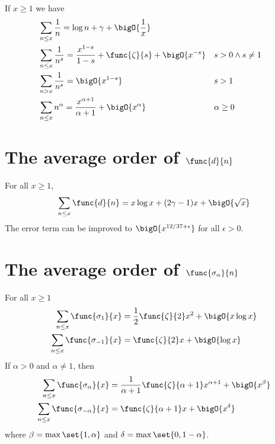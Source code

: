 \begin{theorem}
    If \(x \geq 1\) we have 
    \begin{align}
        &\sum_{n \leq x} \frac{1}{n} = \log n + \gamma + \bigO{\frac{1}{x}}\\
        &\sum_{n \leq x} \dfrac{1}{n^s} = \dfrac{x^{1-s}}{1-s} + \func{\zeta}{s} + \bigO{x^{-s}} & & s > 0 \land s \neq 1\\
        &\sum_{n > x} \dfrac{1}{n^s} = \bigO{x^{1-s}} & & s > 1\\
        &\sum_{n \leq x} n^{\alpha} = \dfrac{x^{\alpha + 1}}{\alpha + 1} + \bigO{x^{\alpha}}  & & \alpha \geq 0
    \end{align}
\end{theorem}
\section{The average order of \(\func{d}{n}\)}
\begin{theorem}
    For all \(x \geq 1\),
    \begin{equation*}
        \sum_{n \leq x} \func{d}{n} = x \log x + (2\gamma - 1) x + \bigO{\sqrt{x}}
    \end{equation*}
    The error term can be improved to \(\bigO{x^{12/37 + \epsilon}}\) for all \(\epsilon > 0\).
\end{theorem}

\section{The average order of \(\func{\sigma_{\alpha}}{n}\)}

\begin{theorem}
    For all \(x \geq 1\)
    \begin{align*}
        \sum_{n \leq x} \func{\sigma_1}{x} &= \dfrac{1}{2} \func{\zeta}{2} x^2 + \bigO{x \log x}\\
        \sum_{n \leq x} \func{\sigma_{-1}}{x} &= \func{\zeta}{2} x + \bigO{\log x}\\
    \end{align*}
    If \(\alpha > 0\) and \(\alpha \neq 1\), then 
    \begin{align*}
        \sum_{n \leq x} \func{\sigma_{\alpha}}{x} &= \dfrac{1}{\alpha + 1} \func{\zeta}{\alpha + 1} x^{\alpha + 1} + \bigO{x^{\beta}}\\
        \sum_{n \leq x} \func{\sigma_{-\alpha}}{x} &= \func{\zeta}{\alpha + 1} x + \bigO{x^{\delta}}\\
    \end{align*}
    where \(\beta = \max\set{1,\alpha}\) and \(\delta = \max\set{0,1-\alpha}\).
\end{theorem}

